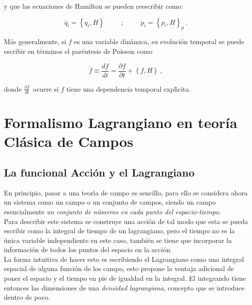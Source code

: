 

\noindent
y que las ecuaciones de Hamilton se pueden reescribir como:

\begin{equation}
\dot{q}_{i}=\left\{ q_{i},H\right\} \qquad~~;~~ \qquad \dot{p}_{i}=\left\{ p_{i},H\right\} _{p}~.  \label{2.16}
\end{equation}

M\'{a}s generalmente, si $f$ es una variable din\'{a}mica, su evoluci\'{o}n temporal se puede escribir en t\'{e}rminos el par\'{e}ntesis de Poisson como

\begin{equation}
\dot{f}\equiv \frac{df}{dt}=\frac{\partial f}{\partial t}+\left\{f,H\right\} ~,  \label{2.17}
\end{equation}

\noindent
donde $\frac{\partial f}{\partial t}$\ ocurre si $f$ tiene una dependencia temporal expl\'{\i}cita.

\section{Formalismo Lagrangiano en teoría Clásica de Campos}

\subsection{La funcional Acción y el Lagrangiano}

\vspace{0.2cm}
En principio, pasar a una teor\'{\i}a de campo es sencillo, para ello se considera ahora un sistema como un 
campo o un conjunto de campos, siendo un campo esencialmente \emph{un conjunto de n\'{u}meros en cada punto 
del espacio-tiempo.}\\

\noindent
Para describir este sistema se construye una acci\'{o}n de tal modo que esta se pueda escribir como la integral 
de tiempo de un lagrangiano, pero el tiempo no es la \'{u}nica variable independiente en este caso, tambi\'{e}n 
se tiene que incorporar la informaci\'{o}n de todos los puntos del espacio en la acci\'{o}n.\\

\noindent
La forma intuitiva de hacer esto es escribiendo el Lagrangiano como una integral espacial de alguna funci\'{o}n de los campo, esto propone la ventaja adicional de poner el espacio y el tiempo en pie de igualdad en la integral. El integrando tiene entonces las dimensiones de una \emph{densidad lagrangiana}, concepto que se introduce dentro de poco.\\

